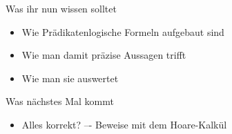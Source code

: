 



\begin{frame}	
	\begin{block}{Was ihr nun wissen solltet}
		\begin{itemize}
			\item Wie Prädikatenlogische Formeln aufgebaut sind
			\item Wie man damit präzise Aussagen trifft
			\item Wie man sie auswertet
		\end{itemize}
	\end{block}
	
	\begin{block}{Was nächstes Mal kommt}
		\begin{itemize}
			\item Alles korrekt? –- Beweise mit dem Hoare-Kalkül
		\end{itemize}
	\end{block}
\end{frame}


